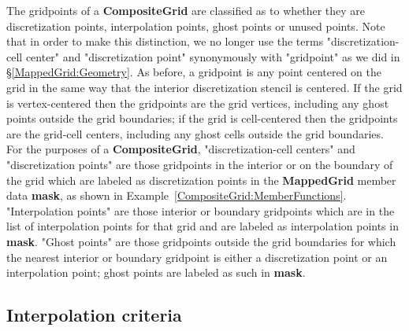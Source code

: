 \documentclass{article}
\begin{document}
The gridpoints of a \textbf{CompositeGrid} are classified as to whether they are discretization points, interpolation points, ghost points
or unused points.  Note that in order to make this distinction, we no longer use the terms "discretization-cell center" and "discretization point"
synonymously with "gridpoint" as we did in \S\ref{MappedGrid:Geometry}.  As before, a gridpoint is any point centered on the grid in the same way
that the interior discretization stencil is centered.  If the grid is vertex-centered then the gridpoints are the grid vertices, including any ghost
points outside the grid boundaries; if the grid is cell-centered then the gridpoints are the grid-cell centers, including any ghost cells outside
the grid boundaries.  For the purposes of a \textbf{CompositeGrid}, "discretization-cell centers" and "discretization points" are those
gridpoints in the interior or on the boundary of the grid which are labeled as discretization points in the \textbf{MappedGrid} member data
\textbf{mask}, as shown in Example~\ref{CompositeGrid:MemberFunctions}.  "Interpolation points" are those interior or boundary
gridpoints which are in the list of interpolation points for that grid and are labeled as interpolation points in \textbf{mask}.  "Ghost
points" are those gridpoints outside the grid boundaries for which the nearest interior or boundary gridpoint is either a discretization point or
an interpolation point; ghost points are labeled as such in \textbf{mask}.

\subsection{Interpolation criteria}
\label{CompositeGrid:InterpolationCriteria}
\end{document}

